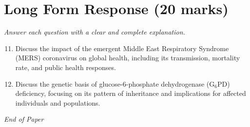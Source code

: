 \documentclass[12pt]{article}
\begin{document}
\section*{Long Form Response (20 marks)}
\textit{Answer each question with a clear and complete explanation.}
\begin{enumerate}[label=\arabic*.]
\setcounter{enumi}{10}
\item Discuss the impact of the emergent Middle East Respiratory Syndrome (MERS) coronavirus on global health, including its transmission, mortality rate, and public health responses.
\item Discuss the genetic basis of glucose-6-phosphate dehydrogenase (G$_{6}$PD) deficiency, focusing on its pattern of inheritance and implications for affected individuals and populations.
\end{enumerate}

\vfill
\noindent\textit{End of Paper}
\end{document}
